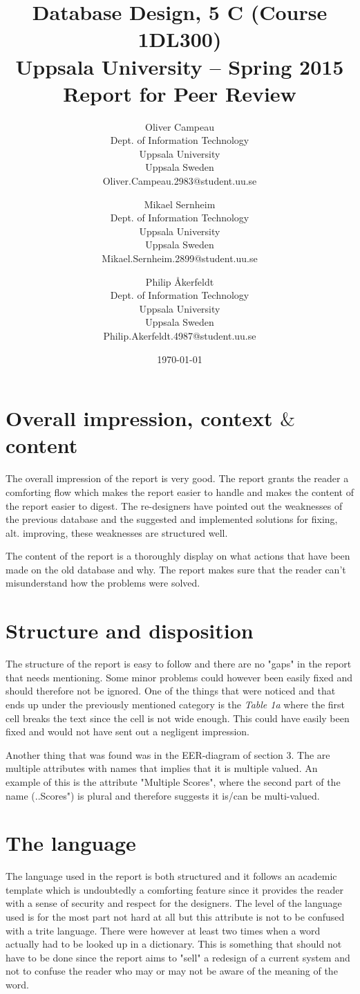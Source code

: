 \documentclass[a4paper,11pt]{article}
\title{\textbf{Database Design, 5 C (Course 1DL300) \\
    Uppsala University -- Spring 2015 \\
    Report for Peer Review}}
\author{
Oliver Campeau\\
\textup{Dept. of Information Technology}\\
\textup{Uppsala University}\\
\textup{Uppsala Sweden}\\
\textup{Oliver.Campeau.2983@student.uu.se}
\and
Mikael Sernheim\\
\textup{Dept. of Information Technology}\\
\textup{Uppsala University}\\
\textup{Uppsala Sweden}\\
\textup{Mikael.Sernheim.2899@student.uu.se}
\and
Philip \AA kerfeldt\\
\textup{Dept. of Information Technology}\\
\textup{Uppsala University}\\
\textup{Uppsala Sweden}\\
\textup{Philip.Akerfeldt.4987@student.uu.se}
}
\date{\today}
\begin{document}
\maketitle
\newpage
\tableofcontents
\pagebreak


\section{Overall impression, context $\&$ content}
The overall impression of the report is very good. The report grants the reader a comforting flow which makes the report easier to handle and makes the content of the report easier to digest. The re-designers have pointed out the weaknesses of the previous database and the suggested and implemented solutions for fixing, alt. improving, these weaknesses are structured well. 

The content of the report is a thoroughly display on what actions that have been made on the old database and why. The report makes sure that the reader can't misunderstand how the problems were solved. 

\section{Structure and disposition}
The structure of the report is easy to follow and there are no "gaps" in the report that needs mentioning. Some minor problems could however been easily fixed and should therefore not be ignored. One of the things that were noticed and that ends up under the previously mentioned category is the \textit{Table 1a} where the first cell breaks the text since the cell is not wide enough. This could have easily been fixed and would not have sent out a negligent impression. 

Another thing that was found was in the EER-diagram of section 3. The are multiple attributes with names that implies that it is multiple valued. An example of this is the attribute "Multiple Scores", where the second part of the name (..Scores") is plural and therefore suggests it is/can be multi-valued.


\section{The language}
The language used in the report is both structured and it follows an academic template which is undoubtedly a comforting feature since it provides the reader with a sense of security and respect for the designers.
The level of the language used is for the most part not hard at all but this attribute is not to be confused with a trite language. There were however at least two times when a word actually had to be looked up in a dictionary. This is something that should not have to be done since the report aims to "sell" a redesign of a current system and not to confuse the reader who may or may not be aware of the meaning of the word.
\end{document}
